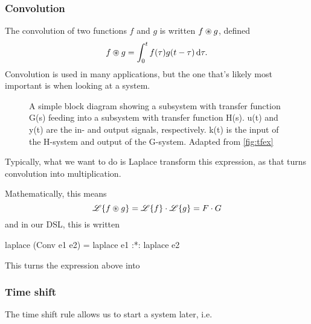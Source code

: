 \subsubsection{Convolution}\label{sec:convol}
The convolution of two functions $f$ and $g$ is written $f \circledast g$, defined
\begin{equation*}
f \circledast g = \int_0^t f(\tau) g(t-\tau) \, \dd\tau.
\end{equation*}
Convolution is used in many applications, but the one that's likely most
important is when looking at a system. 

\begin{figure}[H]
\centering
{}
\caption{A simple block diagram showing a subsystem with transfer function G(s)
  feeding into a subsystem with transfer function H(s). u(t) and y(t) are the
  in- and output signals, respectively. k(t) is the input of the H-system and
  output of the G-system. Adapted from \ref{fig:tfex}}
\label{fig:conv-system}
\end{figure}


Typically, what we want to do is Laplace transform this expression, as that
turns convolution into multiplication.

Mathematically, this means
\begin{equation*}
 \mathscr{L}\{f \circledast g\} = \mathscr{L}\{f\} \cdot \mathscr{L} \{g\} = F \cdot G
\end{equation*}
and in our DSL, this is written
\begin{code}
laplace (Conv e1 e2) = laplace e1 :*: laplace e2
\end{code}

This turns the expression above into

\subsubsection{Time shift}
The time shift rule allows us to start a system later, i.e. 
